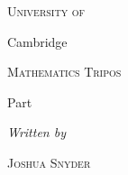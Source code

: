 \begin{titlepage}
  \begin{center}
    \vspace{2cm}
    {\scshape\huge University of \par
      \Huge Cambridge \par}
    \vspace{1cm}
    {\scshape\huge Mathematics Tripos \par}
    \vspace{2cm}
    {\huge Part \npart \par}
    \vspace{0.6cm}
    {\Huge \bfseries \ntitle \par}
    \vspace{1.2cm}
    {\Large\ndate \par}
    \vspace{2cm}
    
    {\large \emph{Written by } \par}
    \vspace{0.2cm}
    {\Large \scshape Joshua Snyder}
 \end{center}
\end{titlepage}